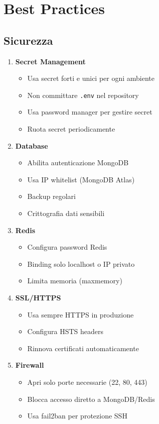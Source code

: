 \documentclass[11pt,a4paper]{article}
\newcommand{\code}[1]{\texttt{#1}}
\begin{document}
\section{Best Practices}

\subsection{Sicurezza}

\begin{enumerate}
    \item \textbf{Secret Management}
    \begin{itemize}
        \item Usa secret forti e unici per ogni ambiente
        \item Non committare \code{.env} nel repository
        \item Usa password manager per gestire secret
        \item Ruota secret periodicamente
    \end{itemize}
    
    \item \textbf{Database}
    \begin{itemize}
        \item Abilita autenticazione MongoDB
        \item Usa IP whitelist (MongoDB Atlas)
        \item Backup regolari
        \item Crittografia dati sensibili
    \end{itemize}
    
    \item \textbf{Redis}
    \begin{itemize}
        \item Configura password Redis
        \item Binding solo localhost o IP privato
        \item Limita memoria (maxmemory)
    \end{itemize}
    
    \item \textbf{SSL/HTTPS}
    \begin{itemize}
        \item Usa sempre HTTPS in produzione
        \item Configura HSTS headers
        \item Rinnova certificati automaticamente
    \end{itemize}
    
    \item \textbf{Firewall}
    \begin{itemize}
        \item Apri solo porte necessarie (22, 80, 443)
        \item Blocca accesso diretto a MongoDB/Redis
        \item Usa fail2ban per protezione SSH
    \end{itemize}
\end{enumerate}
\end{document}
